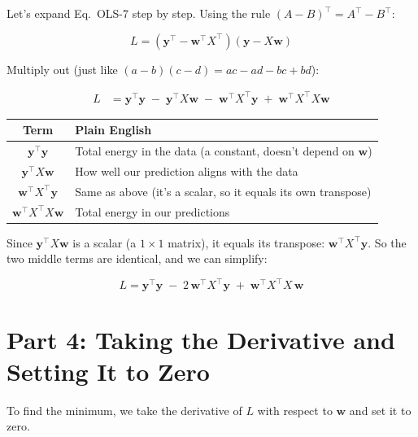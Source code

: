 \documentclass[11pt, a4paper]{article}
\begin{document}
Let's expand Eq.~OLS-7 step by step. Using the rule $(A - B)^\top = A^\top - B^\top$:

\begin{equation}
L = (\mathbf{y}^\top - \mathbf{w}^\top X^\top)(\mathbf{y} - X\mathbf{w})
\tag{OLS-8}
\end{equation}

Multiply out (just like $(a - b)(c - d) = ac - ad - bc + bd$):

\begin{align}
L &= \mathbf{y}^\top \mathbf{y} \;-\; \mathbf{y}^\top X\mathbf{w} \;-\; \mathbf{w}^\top X^\top \mathbf{y} \;+\; \mathbf{w}^\top X^\top X \mathbf{w}
\tag{OLS-9}
\end{align}

\begin{center}
\begin{tabular}{cl}
\toprule
\textbf{Term} & \textbf{Plain English} \\
\midrule
$\mathbf{y}^\top \mathbf{y}$ & Total energy in the data (a constant, doesn't depend on $\mathbf{w}$) \\
$\mathbf{y}^\top X\mathbf{w}$ & How well our prediction aligns with the data \\
$\mathbf{w}^\top X^\top \mathbf{y}$ & Same as above (it's a scalar, so it equals its own transpose) \\
$\mathbf{w}^\top X^\top X \mathbf{w}$ & Total energy in our predictions \\
\bottomrule
\end{tabular}
\end{center}

Since $\mathbf{y}^\top X \mathbf{w}$ is a scalar (a $1\times 1$ matrix), it equals its transpose: $\mathbf{w}^\top X^\top \mathbf{y}$. So the two middle terms are identical, and we can simplify:

\begin{equation}
L = \mathbf{y}^\top \mathbf{y} \;-\; 2\,\mathbf{w}^\top X^\top \mathbf{y} \;+\; \mathbf{w}^\top X^\top X \,\mathbf{w}
\tag{OLS-10}
\end{equation}


\section*{\color{secblue}Part 4: Taking the Derivative and Setting It to Zero}

To find the minimum, we take the derivative of $L$ with respect to $\mathbf{w}$ and set it to zero.
\end{document}
